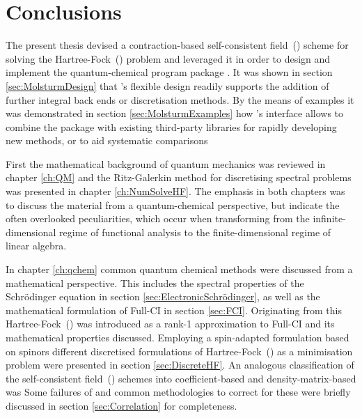 \chapter{Conclusions}
\label{ch:Conclusion}

\noindent
The present thesis devised a contraction-based self-consistent field~(\SCF)
scheme for solving the Hartree-Fock~(\HF) problem
and leveraged it in order to design and implement
the quantum-chemical program package \molsturm.
It was shown in section \ref{sec:MolsturmDesign}
that \molsturm's flexible design readily supports the addition
of further integral back ends or discretisation methods.
By the means of examples it was demonstrated in section \ref{sec:MolsturmExamples}
how \molsturm's \python interface allows to combine the package
with existing third-party libraries
for rapidly developing new methods,
or to aid systematic comparisons

First the mathematical background of quantum mechanics
was reviewed in chapter \ref{ch:QM}
and the Ritz-Galerkin method for discretising
spectral problems was presented in chapter \ref{ch:NumSolveHF}.
The emphasis in both chapters
was to discuss the material from a quantum-chemical perspective,
but indicate the often overlooked peculiarities,
which occur when transforming from the infinite-dimensional regime
of functional analysis to the finite-dimensional regime of linear algebra.

In chapter \vref{ch:qchem} common quantum chemical methods
were discussed from a mathematical perspective.
This includes the spectral properties of the Schrödinger equation
in section \ref{sec:ElectronicSchrödinger},
as well as the mathematical formulation of Full-CI
in section \ref{sec:FCI}.
Originating from this Hartree-Fock~(\HF)
was introduced as a rank-1 approximation to Full-CI
and its mathematical properties discussed.
Employing a spin-adapted formulation based on spinors
different discretised formulations of Hartree-Fock~(\HF)
as a minimisation problem
were presented in section \ref{sec:DiscreteHF}.
An analogous classification of the self-consistent field~(\SCF) schemes
into coefficient-based and density-matrix-based was 
Some failures of \HF and common methodologies
to correct for these were briefly
discussed in section \ref{sec:Correlation} for completeness.



